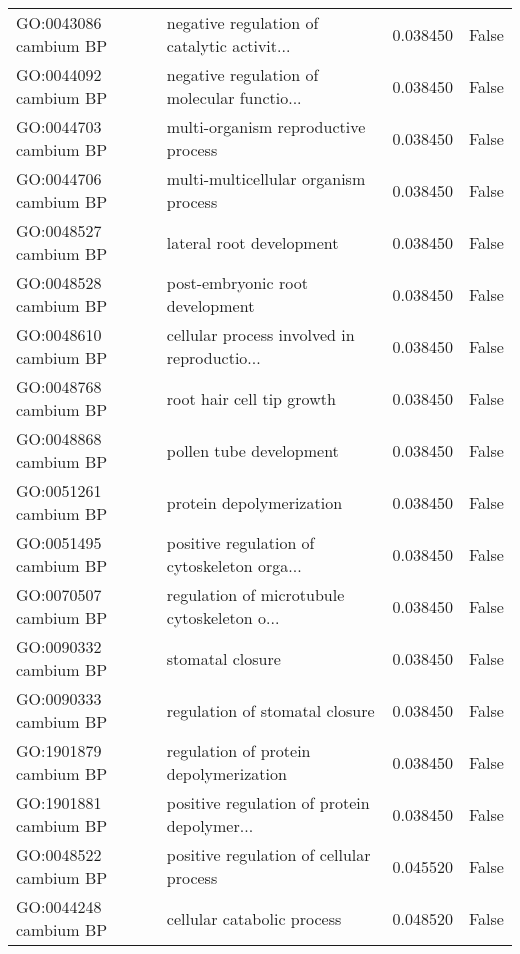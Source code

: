\begin{tabular}{llrl}
GO:0043086 cambium BP       &  negative regulation of catalytic activit... &  0.038450 &  False \\
GO:0044092 cambium BP       &  negative regulation of molecular functio... &  0.038450 &  False \\
GO:0044703 cambium BP       &  multi-organism reproductive process &  0.038450 &  False \\
GO:0044706 cambium BP       &  multi-multicellular organism process &  0.038450 &  False \\
GO:0048527 cambium BP       &  lateral root development &  0.038450 &  False \\
GO:0048528 cambium BP       &  post-embryonic root development &  0.038450 &  False \\
GO:0048610 cambium BP       &  cellular process involved in reproductio... &  0.038450 &  False \\
GO:0048768 cambium BP       &  root hair cell tip growth &  0.038450 &  False \\
GO:0048868 cambium BP       &  pollen tube development &  0.038450 &  False \\
GO:0051261 cambium BP       &  protein depolymerization &  0.038450 &  False \\
GO:0051495 cambium BP       &  positive regulation of cytoskeleton orga... &  0.038450 &  False \\
GO:0070507 cambium BP       &  regulation of microtubule cytoskeleton o... &  0.038450 &  False \\
GO:0090332 cambium BP       &  stomatal closure &  0.038450 &  False \\
GO:0090333 cambium BP       &  regulation of stomatal closure &  0.038450 &  False \\
GO:1901879 cambium BP       &  regulation of protein depolymerization &  0.038450 &  False \\
GO:1901881 cambium BP       &  positive regulation of protein depolymer... &  0.038450 &  False \\
GO:0048522 cambium BP       &  positive regulation of cellular process &  0.045520 &  False \\
GO:0044248 cambium BP       &  cellular catabolic process &  0.048520 &  False \\
\bottomrule
\end{tabular}
